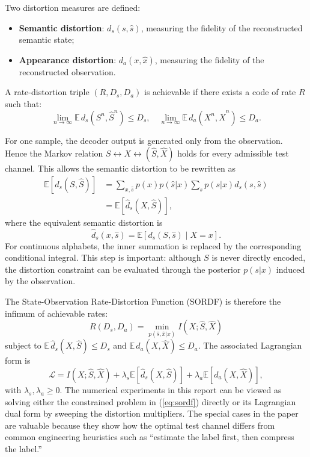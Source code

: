 \documentclass[conference]{IEEEtran}
\begin{document}
Two distortion measures are defined:
\begin{itemize}
    \item \textbf{Semantic distortion}: $d_s(s, \hat{s})$, measuring the fidelity of the reconstructed semantic state;
    \item \textbf{Appearance distortion}: $d_a(x, \hat{x})$, measuring the fidelity of the reconstructed observation.
\end{itemize}

A rate-distortion triple $(R, D_s, D_a)$ is achievable if there exists a code of rate $R$ such that:
\begin{equation}
\lim_{n\to\infty} \mathbb{E}\, d_s(S^n, \hat{S}^n) \leq D_s, \quad
\lim_{n\to\infty} \mathbb{E}\, d_a(X^n, \hat{X}^n) \leq D_a.
\end{equation}

For one sample, the decoder output is generated only from the observation. Hence the Markov relation
$S \leftrightarrow X \leftrightarrow (\hat{S},\hat{X})$ holds for every admissible test channel. This allows the semantic distortion to be rewritten as
\begin{align}
\mathbb{E}[d_s(S,\hat{S})]
&= \sum_{x,\hat{s}} p(x)p(\hat{s}|x)
    \sum_s p(s|x)d_s(s,\hat{s}) \nonumber\\
&= \mathbb{E}[\hat{d}_s(X,\hat{S})],
\end{align}
where the equivalent semantic distortion is
\begin{equation}
\hat{d}_s(x, \hat{s}) = \mathbb{E}[d_s(S, \hat{s}) \mid X = x].
\label{eq:equiv-distortion}
\end{equation}
For continuous alphabets, the inner summation is replaced by the corresponding conditional integral. This step is important: although $S$ is never directly encoded, the distortion constraint can be evaluated through the posterior $p(s|x)$ induced by the observation.

The State-Observation Rate-Distortion Function  (SORDF) is therefore the infimum of achievable rates:
\begin{equation}
R(D_s, D_a) = \min_{p(\hat{s}, \hat{x}|x)} I(X; \hat{S}, \hat{X})
\label{eq:sordf}
\end{equation}
subject to $\mathbb{E}\,\hat{d}_s(X, \hat{S}) \leq D_s$ and $\mathbb{E}\,d_a(X, \hat{X}) \leq D_a$. The associated Lagrangian form is
\begin{equation}
\mathcal{L}=I(X;\hat{S},\hat{X})
 +\lambda_s \mathbb{E}[\hat{d}_s(X,\hat{S})]
 +\lambda_a \mathbb{E}[d_a(X,\hat{X})],
\label{eq:lazard}
\end{equation}
with $\lambda_s,\lambda_a\geq 0$. The numerical experiments in this report can be viewed as solving either the constrained problem in (\ref{eq:sordf}) directly or its Lagrangian dual form by sweeping the distortion multipliers. The special cases in the paper are valuable because they show how the optimal test channel differs from common engineering heuristics such as ``estimate the label first, then compress the label.''
\end{document}
